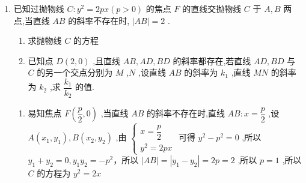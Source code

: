 \begin{enumerate}
    \begin{jieda}
        当$M$位于$x$轴上方时，即当前图中所示情况，根据抛物线焦点弦的性质可知$MF \bot AB$
        
        做$BB_1 \bot l$交$l$于$B_1$，则$\triangle BB_1M \cong \triangle BFM$，故$\angle{BMB_1} = \beta$
        
        设$BM$交$x$轴于$N$，$l$与$x$轴交于$N'$，则一方面$\angle{MNN'} = \beta + \theta$，另一方面$\angle{MNN'} = \angle{MBB'} = \dfrac{\pi}{2} - \beta = \alpha$，因此有$\alpha - \beta = \theta$

        当$M$位于$x$轴下方时，则根据对称性可知有$\beta - \alpha = \theta$
    \end{jieda}

    \item 已知过抛物线 $C : {y}^{2} = {2px}\left( {p > 0}\right)$ 的焦点 $F$ 的直线交抛物线 $C$ 于 $A,B$ 两点,当直线 ${AB}$ 的斜率不存在时, $\left| {AB}\right|  = 2$ .
    \begin{enumerate}
        \item 求抛物线 $C$ 的方程
        \item 已知点 $D\left( {2,0}\right)$ ,且直线 ${AB},{AD},{BD}$ 的斜率都存在,若直线 ${AD},{BD}$ 与 $C$ 的另一个交点分别为 $M$ ,$N$ ,设直线 ${AB}$ 的斜率为 ${k}_{1}$ ,直线 ${MN}$ 的斜率为 ${k}_{2}$ ,求 $\dfrac{{k}_{1}}{{k}_{2}}$ 的值.
    \end{enumerate}
    \begin{jieda}
        \begin{enumerate}
            \item 易知焦点 $F\left( {\dfrac{p}{2},0}\right)$ ,当直线 ${AB}$ 的斜率不存在时,直线 ${AB} : x = \dfrac{p}{2}$ ,设 $A\left( {{x}_{1},{y}_{1}}\right) ,B\left( {{x}_{2},{y}_{2}}\right)$ ,由 $\left\{  \begin{array}{l} x = \dfrac{p}{2} \\  {y}^{2} = {2px} \end{array}\right.$ 可得 ${y}^{2} - {p}^{2} = 0$ ,所以 ${y}_{1} + {y}_{2} = 0,{y}_{1}{y}_{2} =  - {p}^{2}$，所以 $\left| {AB}\right|  = \left| {{y}_{1} - {y}_{2}}\right|  = {2p} = 2$ ,所以 $p = 1$ ,所以 $C$ 的方程为 ${y}^{2} = {2x}$ 
            

\end{enumerate}
\end{jieda}
\end{enumerate}

